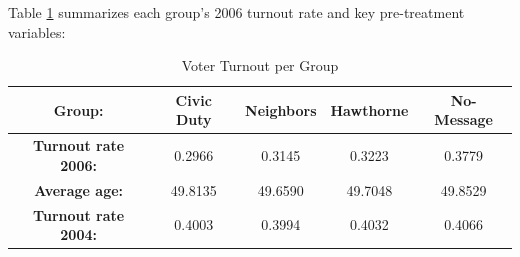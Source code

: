 \documentclass[11pt]{exam}
\begin{document}
Table \ref{tab:turnout} summarizes each group’s 2006 turnout rate and key pre-treatment variables:
\begin{table}[ht]
    \centering
    \caption{Voter Turnout per Group}
    \label{tab:turnout}
    \begin{tabular}{ccccc}
        \toprule
        \textbf{Group:} & Civic Duty & Neighbors & Hawthorne & No-Message \\
        \midrule
        \textbf{Turnout rate 2006:} & 0.2966 & 0.3145 & 0.3223 & 0.3779 \\
        \textbf{Average age:} & 49.8135 & 49.6590 & 49.7048 & 49.8529 \\
        \textbf{Turnout rate 2004:} & 0.4003 & 0.3994 & 0.4032 & 0.4066 \\
        \bottomrule
    \end{tabular}
\end{table}
\end{document}
